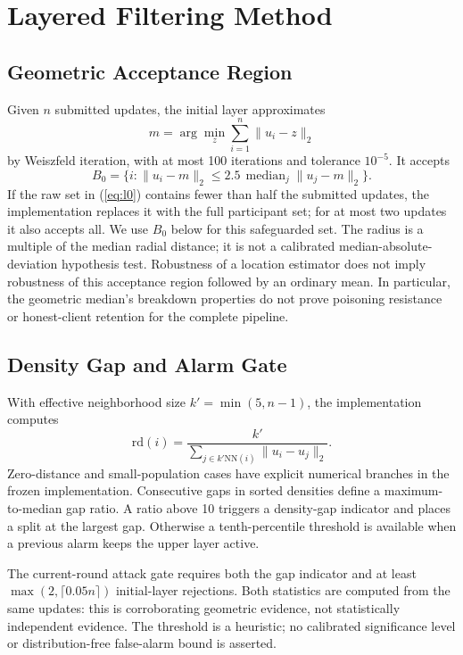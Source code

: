 \documentclass[journal]{IEEEtran}
\newcommand{\rd}{\mathrm{rd}}
\begin{document}
\section{Layered Filtering Method}
\subsection{Geometric Acceptance Region}
Given $n$ submitted updates, the initial layer approximates
\begin{equation}
 m=\arg\min_z\sum_{i=1}^{n}\|u_i-z\|_2
\end{equation}
by Weiszfeld iteration, with at most 100 iterations and tolerance $10^{-5}$. It accepts
\begin{equation}
 B_0=\{i:\|u_i-m\|_2\leq 2.5\,\operatorname{median}_j\|u_j-m\|_2\}.
 \label{eq:l0}
\end{equation}
If the raw set in (\ref{eq:l0}) contains fewer than half the submitted updates, the implementation replaces it with the full participant set; for at most two updates it also accepts all. We use $B_0$ below for this safeguarded set. The radius is a multiple of the median radial distance; it is not a calibrated median-absolute-deviation hypothesis test. Robustness of a location estimator does not imply robustness of this acceptance region followed by an ordinary mean. In particular, the geometric median's breakdown properties do not prove poisoning resistance or honest-client retention for the complete pipeline.

\subsection{Density Gap and Alarm Gate}
With effective neighborhood size $k' = \min(5,n-1)$, the implementation computes
\begin{equation}
\rd(i)=\frac{k'}{\sum_{j\in k'\mathrm{NN}(i)}\|u_i-u_j\|_2}.
\end{equation}
Zero-distance and small-population cases have explicit numerical branches in the frozen implementation. Consecutive gaps in sorted densities define a maximum-to-median gap ratio. A ratio above 10 triggers a density-gap indicator and places a split at the largest gap. Otherwise a tenth-percentile threshold is available when a previous alarm keeps the upper layer active.

The current-round attack gate requires both the gap indicator and at least $\max(2,\lceil0.05n\rceil)$ initial-layer rejections. Both statistics are computed from the same updates: this is corroborating geometric evidence, not statistically independent evidence. The threshold is a heuristic; no calibrated significance level or distribution-free false-alarm bound is asserted.
\end{document}
